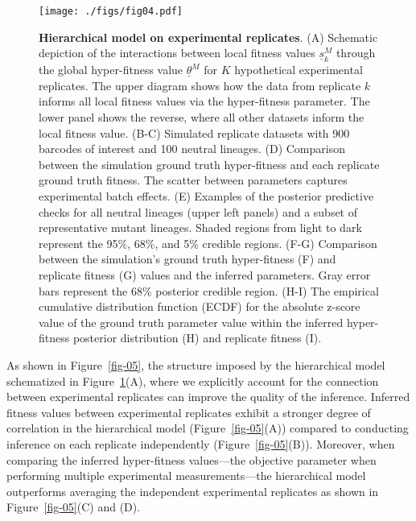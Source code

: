 \documentclass[
  letterpaper,
  DIV=11,
  numbers=noendperiod]{scrartcl}
\begin{document}
\begin{refsegment}
\begin{figure}

{\centering \texttt{[image: ./figs/fig04.pdf]}

}

\caption{\label{fig-04}\textbf{Hierarchical model on experimental
replicates}. (A) Schematic depiction of the interactions between local
fitness values \(\underline{s}_k^M\) through the global hyper-fitness
value \(\underline{\theta}^M\) for \(K\) hypothetical experimental
replicates. The upper diagram shows how the data from replicate \(k\)
informs all local fitness values via the hyper-fitness parameter. The
lower panel shows the reverse, where all other datasets inform the local
fitness value. (B-C) Simulated replicate datasets with 900 barcodes of
interest and 100 neutral lineages. (D) Comparison between the simulation
ground truth hyper-fitness and each replicate ground truth fitness. The
scatter between parameters captures experimental batch effects. (E)
Examples of the posterior predictive checks for all neutral lineages
(upper left panels) and a subset of representative mutant lineages.
Shaded regions from light to dark represent the 95\%, 68\%, and 5\%
credible regions. (F-G) Comparison between the simulation's ground truth
hyper-fitness (F) and replicate fitness (G) values and the inferred
parameters. Gray error bars represent the 68\% posterior credible
region. (H-I) The empirical cumulative distribution function (ECDF) for
the absolute z-score value of the ground truth parameter value within
the inferred hyper-fitness posterior distribution (H) and replicate
fitness (I).}

\end{figure}

As shown in Figure~\ref{fig-05}, the structure imposed by the
hierarchical model schematized in Figure~\ref{fig-04}(A), where we
explicitly account for the connection between experimental replicates
can improve the quality of the inference. Inferred fitness values
between experimental replicates exhibit a stronger degree of correlation
in the hierarchical model (Figure~\ref{fig-05}(A)) compared to
conducting inference on each replicate independently
(Figure~\ref{fig-05}(B)). Moreover, when comparing the inferred
hyper-fitness values---the objective parameter when performing multiple
experimental measurements---the hierarchical model outperforms averaging
the independent experimental replicates as shown in
Figure~\ref{fig-05}(C) and (D).

\begin{figure}


\end{figure}
\end{refsegment}
\end{document}
